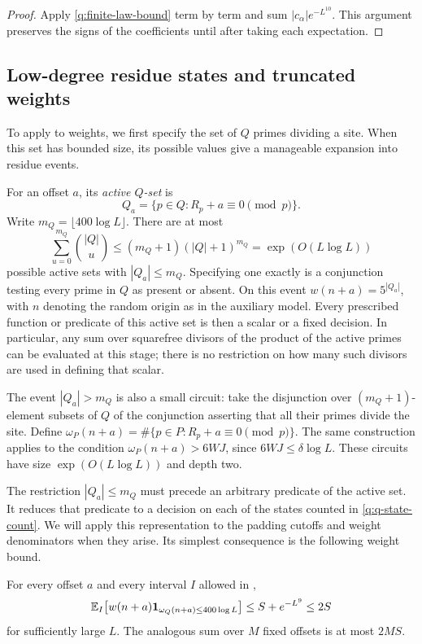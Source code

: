 \begin{proof}
Apply \eqref{q:finite-law-bound} term by term and sum
$|c_\alpha|e^{-L^{10}}$.  This argument preserves the signs of the
coefficients until after taking each expectation.
\end{proof}

\subsection{Low-degree residue states and truncated weights}

To apply  to weights, we first specify the
set of $Q$ primes dividing a site. When this set has bounded size,
its possible values give a manageable expansion into residue events.

For an offset $a$, its \emph{active $Q$-set} is
\[
             Q_a=\{p\in Q:R_p+a\equiv0\pmod p\}.
\]
Write $m_Q=\lfloor400\log L\rfloor$.  There are at most
\begin{equation}\label{q:q-state-count}
 \sum_{u=0}^{m_Q}\binom{|Q|}{u}
       \le(m_Q+1)(|Q|+1)^{m_Q}
       =\exp(O(L\log L))
\end{equation}
possible active sets with $|Q_a|\le m_Q$.  Specifying one exactly
is a conjunction testing every prime in $Q$ as present or absent.
On this event $w(n+a)=5^{|Q_a|}$, with $n$ denoting the random
origin as in the auxiliary model.  Every prescribed function or predicate
of this active set is then a scalar or a fixed decision.  In
particular, any sum over squarefree divisors of the product of the
active primes can be evaluated at this stage; there is no restriction
on how many such divisors are used in defining that scalar.

The event $|Q_a|>m_Q$ is also a small circuit: take the disjunction
over $(m_Q+1)$-element subsets of $Q$ of the conjunction asserting
that all their primes divide the site.  Define $\omega_P(n+a)=\#\{p\in P:R_p+a\equiv0\pmod p\}$.
The same construction applies
to the condition $\omega_P(n+a)>6WJ$, since
$6WJ\le\delta\log L$.  These circuits have size
$\exp(O(L\log L))$ and depth two.

The restriction $|Q_a|\le m_Q$ must precede an arbitrary predicate
of the active set. It reduces that predicate to a decision on each of
the states counted in \eqref{q:q-state-count}. We will apply this
representation to the padding cutoffs and weight denominators when
they arise. Its simplest consequence is the following weight bound.

\begin{corollary}\label{q:truncated-weight}
For every offset $a$ and every interval $I$ allowed in
,
\begin{equation}\label{q:truncated-weight-average}
 \mathbb E_I\bigl[w(n+a)\mathbf 1_{\omega_Q(n+a)\le400\log L}\bigr]
                    \le S+e^{-L^9}\le2S
\end{equation}
for sufficiently large $L$.  The analogous sum over $M$ fixed offsets
is at most $2MS$.
\end{corollary}

